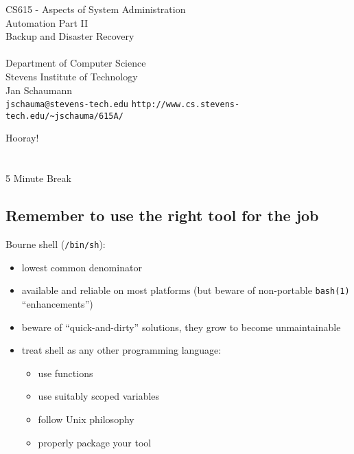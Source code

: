 \documentclass[xga]{xdvislides}
\begin{document}
\setfontphv

\lhead{\slidetitle}                               %
\cfoot{\relax}                               %
\rfoot{\Gray{\today}}

\vspace*{\fill}
\begin{center}
	\Hugesize
		CS615 - Aspects of System Administration\\ [1em]
		Automation Part II \\ [1em]
		Backup and Disaster Recovery \\ [1em]
	\hspace*{5mm}\blueline\\ [1em]
	\Normalsize
		Department of Computer Science\\
		Stevens Institute of Technology\\
		Jan Schaumann\\
		\verb+jschauma@stevens-tech.edu+
		\verb+http://www.cs.stevens-tech.edu/~jschauma/615A/+
\end{center}
\vspace*{\fill}

\newpage
\vspace*{\fill}
\begin{center}
    \Hugesize
        Hooray! \\ [1em]
    \hspace*{5mm}
    \blueline\\
    \hspace*{5mm}\\
        5 Minute Break
\end{center}
\vspace*{\fill}

\subsection{Remember to use the right tool for the job}
Bourne shell ({\tt /bin/sh}):
\begin{itemize}
	\item lowest common denominator
	\item available and reliable on most platforms (but beware of
		non-portable {\tt bash(1)} ``enhancements'')
	\item beware of ``quick-and-dirty'' solutions, they grow to become
		unmaintainable
	\item treat shell as any other programming language:
		\begin{itemize}
			\item use functions
			\item use suitably scoped variables
			\item follow Unix philosophy
			\item properly package your tool
		\end{itemize}
\end{itemize}
\end{document}
